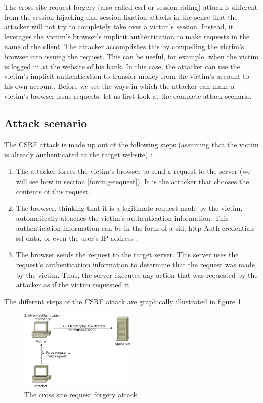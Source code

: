 The cross site request forgery (also called \gls{csrf} or session riding) attack is different from the \gls{session hijacking} and \gls{session fixation} attacks in the sense that the attacker will not try to completely take over a victim's session. Instead, it leverages the victim's browser's implicit authentication to make requests in the name of the client. The attacker accomplishes this by compelling the victim's browser into issuing the request. This can be useful, for example, when the victim is logged in at the website of his bank. In this case, the attacker can use the victim's implicit authentication to transfer money from the victim's account to his own account.
Before we see the ways in which the attacker can make a victim's browser issue requests, let us first look at the complete attack scenario.

\subsection{Attack scenario}

The CSRF attack is made up out of the following steps (assuming that the victim is already authenticated at the target website) \cite{Schreiber2004}:

\begin{enumerate}
	\item The attacker forces the victim's browser to send a request to the server (we will see how in section \ref{forcing-request}). It is the attacker that chooses the contents of this request.
	\item The browser, thinking that it is a legitimate request made by the victim, automatically attaches the victim's authentication information. This authentication information can be in the form of a \gls{sid}, \gls{http} Auth credentials \gls{ssl} data, or even the user's IP address \cite{Johns2006b,Zeller2008}.
	\item The browser sends the request to the target server. This server uses the request's authentication information to determine that the request was made by the victim. Thus, the server executes any action that was requested by the attacker as if the victim requested it.
\end{enumerate}

The different steps of the CSRF attack are graphically illustrated in figure \ref{fig:csrf}.

\begin{figure}[ht]
	\centering
	\includegraphics[width=0.50\textwidth]{img/csrf.png}
	\caption{The cross site request forgery attack}
	\label{fig:csrf}
\end{figure}

